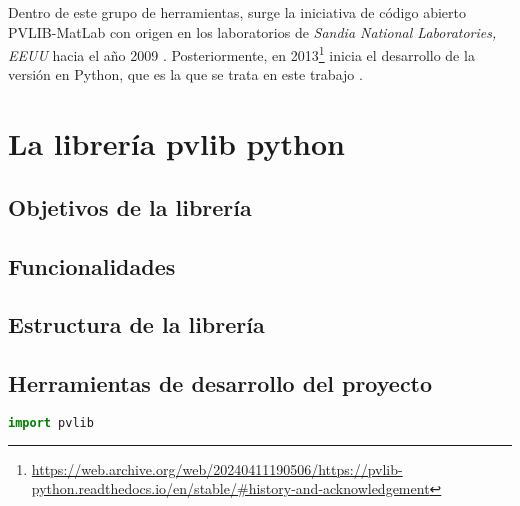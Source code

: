 Dentro de este grupo de herramientas, surge la iniciativa de código abierto PVLIB-MatLab con origen en los laboratorios de \textit{Sandia National Laboratories, EEUU} hacia el año 2009 \cite{pvlib_history}. Posteriormente, en 2013\footnote{\url{https://web.archive.org/web/20240411190506/https://pvlib-python.readthedocs.io/en/stable/\#history-and-acknowledgement}} inicia el desarrollo de la versión en Python, que es la que se trata en este trabajo \cite{pvlib_python}.

\section{La librería pvlib python} \label{sct:pvlib}

\subsection{Objetivos de la librería} \label{ssct:pvlib:objetivos}

\subsection{Funcionalidades} \label{ssct:pvlib:funcionalidades}

\subsection{Estructura de la librería} \label{ssct:pvlib:estructura}

\subsection{Herramientas de desarrollo del proyecto} \label{ssct:pvlib:herramientas}

\begin{lstlisting}[language=Python]
import pvlib

\end{lstlisting}
